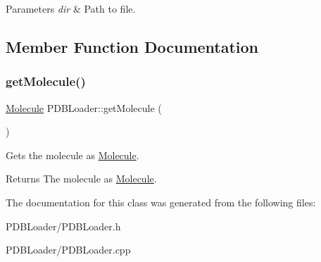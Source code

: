 \begin{DoxyParams}{Parameters}
{\em dir} & Path to file. \\
\hline
\end{DoxyParams}


\subsection{Member Function Documentation}
\mbox{\label{class_p_d_b_loader_af65928b5d5035c212c2298f7533608ce}} 
\subsubsection{\texorpdfstring{getMolecule()}{getMolecule()}}
{\footnotesize\ttfamily \mbox{\hyperlink{struct_molecule}{Molecule}} P\+D\+B\+Loader\+::get\+Molecule (\begin{DoxyParamCaption}{ }\end{DoxyParamCaption})}

Gets the molecule as \mbox{\hyperlink{struct_molecule}{Molecule}}.

\begin{DoxyReturn}{Returns}
The molecule as \mbox{\hyperlink{struct_molecule}{Molecule}}. 
\end{DoxyReturn}


The documentation for this class was generated from the following files\+:\begin{DoxyCompactItemize}
\item 
P\+D\+B\+Loader/P\+D\+B\+Loader.\+h\item 
P\+D\+B\+Loader/P\+D\+B\+Loader.\+cpp\end{DoxyCompactItemize}
